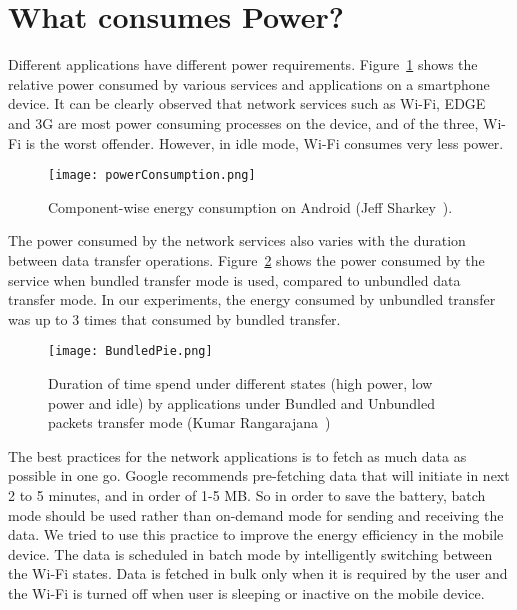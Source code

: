 \section{What consumes Power?}
\label{sec:WCP}
Different applications have different power requirements. Figure~\ref{fig:chart} shows the relative power consumed by various services and applications on a smartphone device. It can be clearly observed that network services such as
Wi-Fi, EDGE and 3G are most power consuming processes on the device, and of the three, Wi-Fi is the worst offender.
However, in idle mode, Wi-Fi consumes very less power.

\begin{figure}[ht]
\centering
\texttt{[image: powerConsumption.png]}
\caption{Component-wise energy consumption on Android (Jeff Sharkey~\cite{bworld}).}
\label{fig:chart}
\end{figure}

The power consumed by the network services also varies with the duration between data transfer operations.
Figure~\ref{fig:pie}  shows the power consumed by the service when bundled transfer
mode is used, compared to unbundled data transfer mode. In our experiments, the energy consumed
by unbundled transfer was up to 3 times that consumed by bundled transfer.

\begin{figure}
\centering
\texttt{[image: BundledPie.png]}
\caption{Duration of time spend under different states (high power, low power and idle) by applications under Bundled and Unbundled packets transfer mode (Kumar Rangarajana~\cite{battery})}
\label{fig:pie}
\end{figure}

The best practices for the network applications is to fetch as much data as possible in one go. Google recommends pre-fetching data that will initiate in next 2 to 5 minutes, and in order of 1-5 MB. So in order to save the battery, batch mode should be used rather than on-demand mode for sending and receiving the data. We tried to use this practice to improve the energy efficiency in the mobile device. The data is scheduled in batch mode by intelligently switching between the Wi-Fi states. Data is fetched in bulk only when it is required by the user and the Wi-Fi is turned off when user is sleeping or inactive on the mobile device.


